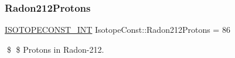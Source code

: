 \subsubsection{\texorpdfstring{Radon212\+Protons}{Radon212Protons}}
{\footnotesize\ttfamily \mbox{\hyperlink{group___isotope_const-_macros_ga5f18360b3e99483a35c32d789e62621c}{I\+S\+O\+T\+O\+P\+E\+C\+O\+N\+S\+T\+\_\+\+I\+NT}} Isotope\+Const\+::\+Radon212\+Protons = 86}

\$ \$ Protons in Radon-\/212. 